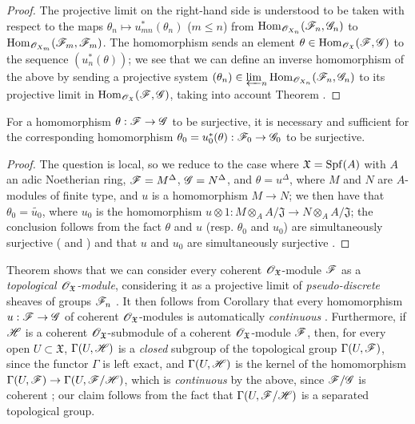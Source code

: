 \begin{proof}
\label{proof-1.10.11.4}
The projective limit on the right-hand side is understood to be taken with respect to the maps $\theta_n\mapsto u_{mn}^*(\theta_n)$ ($m\leq n$) from $\operatorname{Hom}_{\mathscr{O}_{X_n}}(\mathscr{F}_n,\mathscr{G}_n)$ to $\operatorname{Hom}_{\mathscr{O}_{X_m}}(\mathscr{F}_m,\mathscr{F}_m)$.
The homomorphism  sends an element $\theta\in\operatorname{Hom}_{\mathscr{O}_\mathfrak{X}}(\mathscr{F},\mathscr{G})$ to the sequence $(u_n^*(\theta))$; we see that we can define an inverse homomorphism of the above by sending a projective system $(\theta_n)\in\varprojlim_n\operatorname{Hom}_{\mathscr{O}_{X_n}}(\mathscr{F}_n,\mathscr{G}_n)$ to its projective limit in $\operatorname{Hom}_{\mathscr{O}_\mathfrak{X}}(\mathscr{F},\mathscr{G})$, taking into account Theorem .
\end{proof}

\begin{corollary}[10.11.5]
\label{1.10.11.5}
For a homomorphism $\theta:\sh{F}\to\sh{G}$ to be surjective, it is necessary and sufficient for the corresponding homomorphism $\theta_0=u_0^*(\theta):\sh{F}_0\to\sh{G}_0$ to be surjective.
\end{corollary}

\begin{proof}
\label{proof-1.10.11.5}
The question is local, so we reduce to the case where $\mathfrak{X}=\operatorname{Spf}(A)$ with $A$ an adic Noetherian ring, $\mathscr{F}=M^\Delta$, $\mathscr{G}=N^\Delta$, and $\theta=u^\Delta$, where $M$ and $N$ are $A$-modules of finite type, and $u$ is a homomorphism $M\to N$; we then have that $\theta_0=\widetilde{u_0}$, where $u_0$ is the homomorphism $u\otimes 1:M\otimes_A A/\mathfrak{J}\to N\otimes_A A/\mathfrak{J}$; the conclusion follows from the fact $\theta$ and $u$ (resp. $\theta_0$ and $u_0$) are simultaneously surjective ( and ) and that $u$ and $u_0$ are simultaneously surjective .
\end{proof}

\begin{env}[10.11.6]
\label{1.10.11.6}
Theorem  shows that we can consider every coherent $\mathscr{O}_\mathfrak{X}$-module $\mathscr{F}$ as a \emph{topological $\mathscr{O}_\mathfrak{X}$-module}, considering it as a projective limit of \emph{pseudo-discrete} sheaves of groups $\mathscr{F}_n$ .
It then follows from Corollary  that every homomorphism $u:\sh{F}\to\sh{G}$ of coherent $\mathscr{O}_\mathfrak{X}$-modules is automatically \emph{continuous}
.
Furthermore, if $\mathscr{H}$ is a coherent $\mathscr{O}_\mathfrak{X}$-submodule of a coherent $\mathscr{O}_\mathfrak{X}$-module $\mathscr{F}$, then, for every open $U\subset\mathfrak{X}$, $\Gamma(U,\mathscr{H})$ is a \emph{closed} subgroup of the topological group $\Gamma(U,\mathscr{F})$, since the functor $\Gamma$ is left exact, and $\Gamma(U,\mathscr{H})$ is the kernel of the homomorphism $\Gamma(U,\sh{F})\to\Gamma(U,\sh{F}/\sh{H})$, which is \emph{continuous} by the above, since $\mathscr{F}/\mathscr{G}$ is coherent ; our claim follows from the fact that $\Gamma(U,\mathscr{F}/\mathscr{H})$ is a separated topological group.
\end{env}

